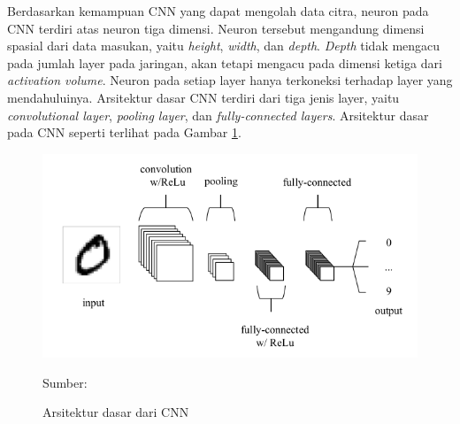 Berdasarkan kemampuan CNN yang dapat mengolah data citra, neuron pada CNN terdiri atas neuron tiga dimensi. Neuron tersebut mengandung dimensi spasial dari data masukan, yaitu \textit{height}, \textit{width}, dan \textit{depth}. \textit{Depth} tidak mengacu pada jumlah layer pada jaringan, akan tetapi mengacu pada dimensi ketiga dari \textit{activation volume}. Neuron pada setiap layer hanya terkoneksi terhadap layer yang mendahuluinya. Arsitektur dasar CNN terdiri dari tiga jenis layer, yaitu \textit{convolutional layer}, \textit{pooling layer}, dan \textit{fully-connected layers}. Arsitektur dasar pada CNN seperti terlihat pada Gambar \ref{fig:cnn}.

\begin{figure}[H]
    \begin{center}
        \includegraphics[width=12cm]{../img/CNN Basic - Latex.png}
        \caption{Arsitektur dasar dari CNN}
        \label{fig:cnn}
        Sumber: \citep{OShea2015}
    \end{center}
\end{figure}

